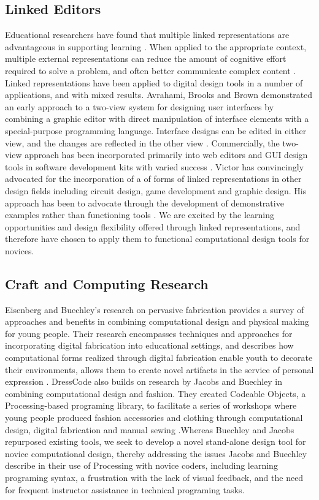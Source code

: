 \documentclass{sigchi}
\begin{document}
\subsection{Linked Editors}
Educational researchers have found that multiple linked representations are advantageous in supporting learning \cite{white}. When applied to the appropriate context, multiple external representations can reduce the amount of cognitive effort required to solve a problem, and often better communicate complex content \cite{ainsworth}. Linked representations have been applied to digital design tools in a number of applications, and with mixed results. Avrahami, Brooks and Brown demonstrated an early approach to a two-view system for designing user interfaces by combining a graphic editor with direct manipulation of interface elements with a special-purpose programming language. Interface designs can be edited in either view, and the changes are reflected in the other view \cite{two_view_ui}. Commercially, the two-view approach has been incorporated primarily into web editors and GUI design tools in software development kits with varied success \cite{view_based}. Victor has convincingly advocated for the incorporation of a of forms of linked representations in other design fields including circuit design, game development and graphic design. His approach has been to advocate through the development of demonstrative examples rather than functioning tools \cite{victor}. We are excited by the learning opportunities and design flexibility offered through linked representations, and therefore have chosen to apply them to functional computational design tools for novices.

\subsection{Craft and Computing Research}
Eisenberg and Buechley's research on pervasive fabrication provides a survey of approaches and benefits in combining computational design and physical making for young people. Their research encompasses techniques and approaches for incorporating digital fabrication into educational settings, and describes how computational forms realized through digital fabrication enable youth to decorate their environments, allows them to create novel artifacts in the service of personal expression \cite{pervasive_fab}. DressCode also builds on research by Jacobs and Buechley in combining computational design and fashion. They created Codeable Objects, a Processing-based programing library, to facilitate a series of workshops where young people produced fashion accessories and clothing through computational design, digital fabrication and manual sewing \cite{codeable_objects}.Whereas Buechley and Jacobs repurposed existing tools, we seek to develop a novel stand-alone design tool for novice computational design, thereby addressing the issues Jacobs and Buechley describe in their use of Processing with novice coders, including learning programing syntax, a frustration with the lack of visual feedback, and the need for frequent instructor assistance in technical programing tasks. 
\end{document}
